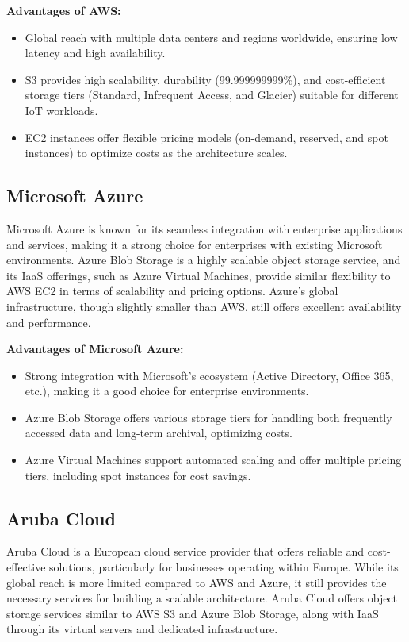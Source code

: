 \textbf{Advantages of AWS:}
\begin{itemize}
    \item Global reach with multiple data centers and regions worldwide, ensuring low latency and high availability.
    \item S3 provides high scalability, durability (99.999999999\%), and cost-efficient storage tiers (Standard, Infrequent Access, and Glacier) suitable for different IoT workloads.
    \item EC2 instances offer flexible pricing models (on-demand, reserved, and spot instances) to optimize costs as the architecture scales.
\end{itemize}

\subsection*{Microsoft Azure}
Microsoft Azure is known for its seamless integration with enterprise applications and services, making it a strong choice for enterprises with existing Microsoft environments. Azure Blob Storage is a highly scalable object storage service, and its IaaS offerings, such as Azure Virtual Machines, provide similar flexibility to AWS EC2 in terms of scalability and pricing options. Azure's global infrastructure, though slightly smaller than AWS, still offers excellent availability and performance.

\textbf{Advantages of Microsoft Azure:}
\begin{itemize}
    \item Strong integration with Microsoft’s ecosystem (Active Directory, Office 365, etc.), making it a good choice for enterprise environments.
    \item Azure Blob Storage offers various storage tiers for handling both frequently accessed data and long-term archival, optimizing costs.
    \item Azure Virtual Machines support automated scaling and offer multiple pricing tiers, including spot instances for cost savings.
\end{itemize}

\subsection*{Aruba Cloud}
Aruba Cloud is a European cloud service provider that offers reliable and cost-effective solutions, particularly for businesses operating within Europe. While its global reach is more limited compared to AWS and Azure, it still provides the necessary services for building a scalable architecture. Aruba Cloud offers object storage services similar to AWS S3 and Azure Blob Storage, along with IaaS through its virtual servers and dedicated infrastructure.

